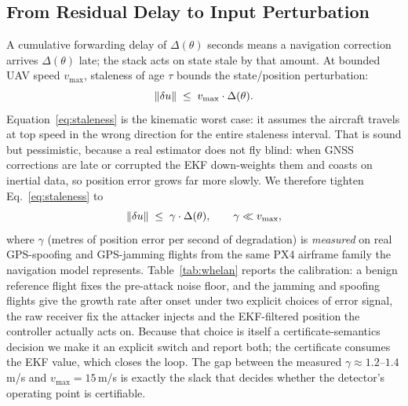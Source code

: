 \subsection{From Residual Delay to Input Perturbation}
A cumulative forwarding delay of $\Delta(\theta)$ seconds means a navigation
correction arrives $\Delta(\theta)$ late; the stack acts on state stale by that
amount. At bounded UAV speed $v_{\max}$, staleness of age $\tau$ bounds the
state/position perturbation:
\begin{equation}
\label{eq:staleness}
\left\lVert \delta u\right\rVert \;\le\; v_{\max}\cdot \Delta(\theta).
\end{equation}
Equation~\eqref{eq:staleness} is the kinematic worst case: it assumes the
aircraft travels at top speed in the wrong direction for the entire staleness
interval. That is sound but pessimistic, because a real estimator does not fly
blind: when GNSS corrections are late or corrupted the EKF down-weights them
and coasts on inertial data, so position error grows far more slowly. We
therefore tighten Eq.~\eqref{eq:staleness} to
\begin{equation}
\label{eq:gamma}
\left\lVert \delta u\right\rVert\;\le\;\gamma\cdot\Delta(\theta),\qquad \gamma\ll v_{\max},
\end{equation}
where $\gamma$ (metres of position error per second of degradation) is
\emph{measured} on real GPS-spoofing and GPS-jamming flights from the same PX4
airframe family the navigation model represents. Table~\ref{tab:whelan} reports
the calibration: a benign reference flight fixes the pre-attack noise floor, and
the jamming and spoofing flights give the growth rate after onset under two
explicit choices of error signal, the raw receiver fix the attacker injects
and the EKF-filtered position the controller actually acts on. Because that
choice is itself a certificate-semantics decision we make it an explicit switch
and report both; the certificate consumes the EKF value, which closes the loop.
The gap between the measured $\gamma\approx1.2$--$1.4$\,m/s and
$v_{\max}=15$\,m/s is exactly the slack that decides whether the detector's
operating point is certifiable.

